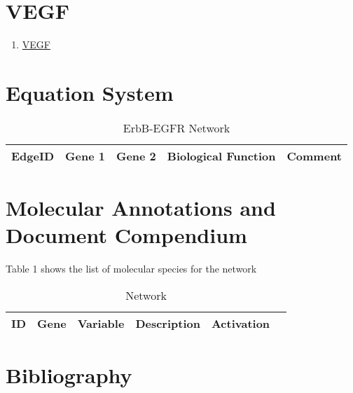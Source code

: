 
\section{VEGF}

\begin{enumerate}
\item \href{https://www.genome.jp/kegg-bin/show_pathway?map=hsa04012&show_description=show}{VEGF}
\end{enumerate}

\section{Equation System}


\begin{table}[H]
	\tiny
	\begin{tabular}{p{1cm}p{1cm}p{3cm}p{1cm}p{1cm}} 
		EdgeID & Gene 1 & Gene 2 & Biological Function & Comment \\
		\hline
    
    \end{tabular}
	\caption{ErbB-EGFR Network}
	\label{tab:Table2}
\end{table}


\section{Molecular Annotations and Document Compendium}

Table 1 shows the list of molecular species for the network
\vspace{8pt}
\begin{table}[H]
	\begin{tabular}{rlllll}
		\hline
		ID & Gene & Variable & Description & Activation \\ 
		\hline

		\hline
	\end{tabular}
	\caption{Network}
	\label{tab:Table2}
\end{table}

\section{Bibliography}

